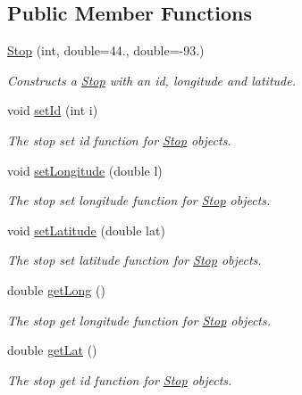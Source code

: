 \subsection*{Public Member Functions}
\begin{DoxyCompactItemize}
\item 
\hyperlink{classStop_a59d881f072b1cf89512bb15a51ffc773}{Stop} (int, double=44., double=-\/93.)
\begin{DoxyCompactList}\small\item\em Constructs a \hyperlink{classStop}{Stop} with an id, longitude and latitude. \end{DoxyCompactList}\item 
void \hyperlink{classStop_a936324668d7b9f5edfbe4531cf244608}{set\+Id} (int i)
\begin{DoxyCompactList}\small\item\em The stop set id function for \hyperlink{classStop}{Stop} objects. \end{DoxyCompactList}\item 
void \hyperlink{classStop_a26866e7dfd469467c67d4176693b53c7}{set\+Longitude} (double l)
\begin{DoxyCompactList}\small\item\em The stop set longitude function for \hyperlink{classStop}{Stop} objects. \end{DoxyCompactList}\item 
void \hyperlink{classStop_ad70323088d687724e6eaad1eb723061f}{set\+Latitude} (double lat)
\begin{DoxyCompactList}\small\item\em The stop set latitude function for \hyperlink{classStop}{Stop} objects. \end{DoxyCompactList}\item 
double \hyperlink{classStop_aea4bfbf489a3a61ecb104e9aa9f613c4}{get\+Long} ()
\begin{DoxyCompactList}\small\item\em The stop get longitude function for \hyperlink{classStop}{Stop} objects. \end{DoxyCompactList}\item 
double \hyperlink{classStop_ad26553052a5ee0c478f4988ec51236d9}{get\+Lat} ()
\begin{DoxyCompactList}\small\item\em The stop get id function for \hyperlink{classStop}{Stop} objects. \end{DoxyCompactList}\item 

\end{DoxyCompactItemize}
